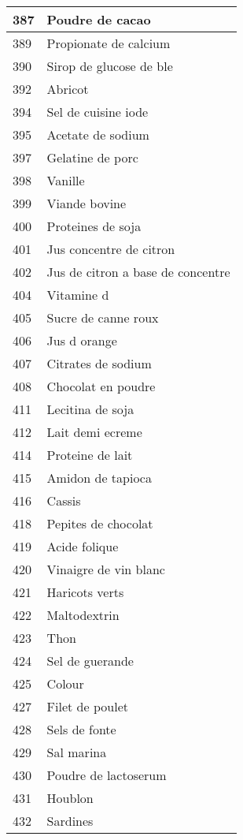 \begin{longtable}{|l|l|}
387 & Poudre de cacao \\ \hline 
389 & Propionate de calcium \\ \hline 
390 & Sirop de glucose de ble \\ \hline 
392 & Abricot \\ \hline 
394 & Sel de cuisine iode \\ \hline 
395 & Acetate de sodium \\ \hline 
397 & Gelatine de porc \\ \hline 
398 & Vanille \\ \hline 
399 & Viande bovine \\ \hline 
400 & Proteines de soja \\ \hline 
401 & Jus concentre de citron \\ \hline 
402 & Jus de citron a base de concentre \\ \hline 
404 & Vitamine d \\ \hline 
405 & Sucre de canne roux \\ \hline 
406 & Jus d orange \\ \hline 
407 & Citrates de sodium \\ \hline 
408 & Chocolat en poudre \\ \hline 
411 & Lecitina de soja \\ \hline 
412 & Lait demi ecreme \\ \hline 
414 & Proteine de lait \\ \hline 
415 & Amidon de tapioca \\ \hline 
416 & Cassis \\ \hline 
418 & Pepites de chocolat \\ \hline 
419 & Acide folique \\ \hline 
420 & Vinaigre de vin blanc \\ \hline 
421 & Haricots verts \\ \hline 
422 & Maltodextrin \\ \hline 
423 & Thon \\ \hline 
424 & Sel de guerande \\ \hline 
425 & Colour \\ \hline 
427 & Filet de poulet \\ \hline 
428 & Sels de fonte \\ \hline 
429 & Sal marina \\ \hline 
430 & Poudre de lactoserum \\ \hline 
431 & Houblon \\ \hline 
432 & Sardines \\ \hline 

\end{longtable}
